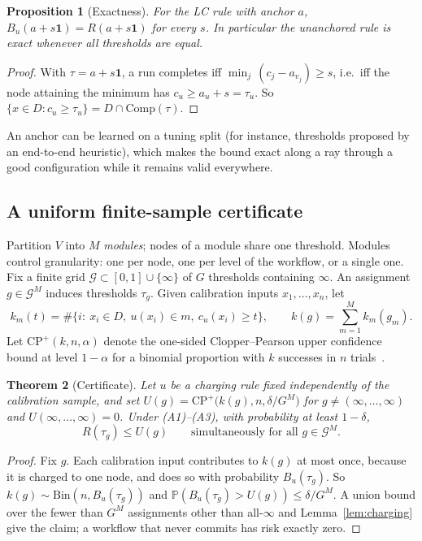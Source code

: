 \documentclass[11pt]{article}
\newtheorem{theorem}{Theorem}
\newtheorem{proposition}[theorem]{Proposition}
\theoremstyle{definition}
\theoremstyle{remark}
\newcommand{\Prob}{\mathbb{P}}
\newcommand{\Comp}{\mathrm{Comp}}
\newcommand{\CP}{\mathrm{CP}^{+}}
\begin{document}
\begin{proposition}[Exactness]\label{prop:exact}
For the LC rule with anchor $a$, $B_u(a+s\mathbf{1})=R(a+s\mathbf{1})$ for every $s$. In
particular the unanchored rule is exact whenever all thresholds are equal.
\end{proposition}
\begin{proof}
With $\tau=a+s\mathbf 1$, a run completes iff $\min_j\,(c_j-a_{v_j})\ge s$, i.e.\ iff the node
attaining the minimum has $c_u\ge a_{u}+s=\tau_{u}$. So $\{x\in D:c_u\ge\tau_u\}=D\cap\Comp(\tau)$.
\end{proof}

An anchor can be learned on a tuning split (for instance, thresholds proposed by an
end-to-end heuristic), which makes the bound exact along a ray through a good configuration
while it remains valid everywhere.

\subsection{A uniform finite-sample certificate}

Partition $V$ into $M$ \emph{modules}; nodes of a module share one threshold. Modules control
granularity: one per node, one per level of the workflow, or a single one. Fix a finite grid
$\mathcal G\subset[0,1]\cup\{\infty\}$ of $G$ thresholds containing $\infty$. An assignment
$g\in\mathcal G^M$ induces thresholds $\tau_g$. Given calibration inputs $x_1,\dots,x_n$, let
\[
k_m(t)=\#\{i:\ x_i\in D,\ u(x_i)\in m,\ c_u(x_i)\ge t\},\qquad k(g)=\sum_{m=1}^M k_m(g_m).
\]
Let $\CP(k,n,\alpha)$ denote the one-sided Clopper--Pearson upper confidence bound at level
$1-\alpha$ for a binomial proportion with $k$ successes in $n$ trials~\citep{clopper1934}.

\begin{theorem}[Certificate]\label{thm:cert}
Let $u$ be a charging rule fixed independently of the calibration sample, and set
$U(g)=\CP\bigl(k(g),n,\delta/G^M\bigr)$ for $g\ne(\infty,\dots,\infty)$ and $U(\infty,\dots,\infty)=0$.
Under \textup{(A1)--(A3)}, with probability at least $1-\delta$,
\[
R(\tau_g)\le U(g)\qquad\text{simultaneously for all } g\in\mathcal G^M.
\]
\end{theorem}
\begin{proof}
Fix $g$. Each calibration input contributes to $k(g)$ at most once, because it is charged to
one node, and does so with probability $B_u(\tau_g)$. So $k(g)\sim\mathrm{Bin}(n,B_u(\tau_g))$
and $\Prob(B_u(\tau_g)>U(g))\le\delta/G^M$. A union bound over the fewer than $G^M$ assignments
other than all-$\infty$ and Lemma~\ref{lem:charging} give the claim; a workflow that never
commits has risk exactly zero.
\end{proof}
\end{document}
